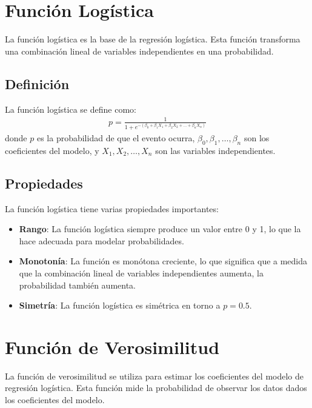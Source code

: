 \documentclass[a4paper]{report} %
\begin{document}
\section{Funci\'on Log\'istica}

La funci\'on log\'istica es la base de la regresi\'on log\'istica. Esta funci\'on transforma una combinaci\'on lineal de variables independientes en una probabilidad.

\subsection{Definici\'on}

La funci\'on log\'istica se define como:
\begin{eqnarray*}
p = \frac{1}{1 + e^{-(\beta_0 + \beta_1 X_1 + \beta_2 X_2 + \ldots + \beta_n X_n)}}
\end{eqnarray*}
donde $p$ es la probabilidad de que el evento ocurra, $\beta_0, \beta_1, \ldots, \beta_n$ son los coeficientes del modelo, y $X_1, X_2, \ldots, X_n$ son las variables independientes.

\subsection{Propiedades}

La funci\'on log\'istica tiene varias propiedades importantes:
\begin{itemize}
    \item \textbf{Rango}: La funci\'on log\'istica siempre produce un valor entre 0 y 1, lo que la hace adecuada para modelar probabilidades.
    \item \textbf{Monoton\'ia}: La funci\'on es mon\'otona creciente, lo que significa que a medida que la combinaci\'on lineal de variables independientes aumenta, la probabilidad tambi\'en aumenta.
    \item \textbf{Simetr\'ia}: La funci\'on log\'istica es sim\'etrica en torno a $p = 0.5$.
\end{itemize}

\section{Funci\'on de Verosimilitud}

La funci\'on de verosimilitud se utiliza para estimar los coeficientes del modelo de regresi\'on log\'istica. Esta funci\'on mide la probabilidad de observar los datos dados los coeficientes del modelo.
\end{document}
